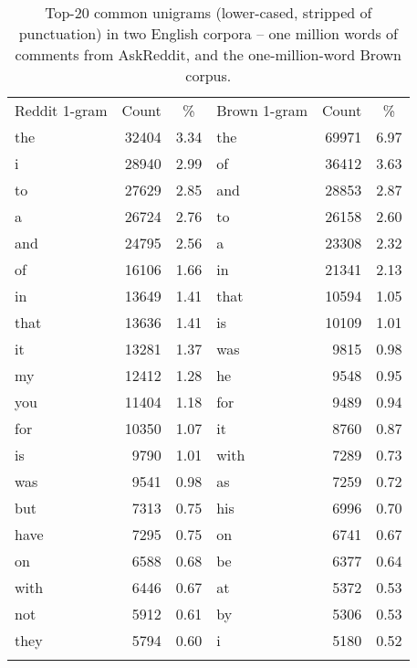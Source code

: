\begin{table}
\begin{tabular}{lrc  lrc}
\lsptoprule
{Reddit 1-gram} & {Count} & {\%} & {Brown 1-gram} & {Count} & {\%}  \\ \cmidrule(r){1-3} \cmidrule(l){4-6}
the & 32404 & 3.34 & the & 69971 & 6.97 \\
i & 28940 & 2.99 & of & 36412 & 3.63 \\
to & 27629 & 2.85 & and & 28853 & 2.87 \\
a & 26724 & 2.76 & to & 26158 & 2.60 \\
and & 24795 & 2.56 & a & 23308 & 2.32 \\
of & 16106 & 1.66 & in & 21341 & 2.13 \\
in & 13649 & 1.41 & that & 10594 & 1.05 \\
that & 13636 & 1.41 & is & 10109 & 1.01 \\
it & 13281 & 1.37 & was & 9815 & 0.98 \\
my & 12412 & 1.28 & he & 9548 & 0.95 \\
you & 11404 & 1.18 & for & 9489 & 0.94 \\
for & 10350 & 1.07 & it & 8760 & 0.87 \\
is & 9790 & 1.01 & with & 7289 & 0.73 \\
was & 9541 & 0.98 & as & 7259 & 0.72 \\
but & 7313 & 0.75 & his & 6996 & 0.70 \\
have & 7295 & 0.75 & on & 6741 & 0.67 \\
on & 6588 & 0.68 & be & 6377 & 0.64 \\
with & 6446 & 0.67 & at & 5372 & 0.53 \\
not & 5912 & 0.61 & by & 5306 & 0.53 \\
they & 5794 & 0.60 & i & 5180 & 0.52 \\
\lspbottomrule
\end{tabular}
\caption{Top-20 common unigrams (lower-cased, stripped of punctuation) in two English corpora -- one million words of comments from AskReddit, and the one-million-word Brown corpus.}
\label{fig:1grams}
\end{table}



